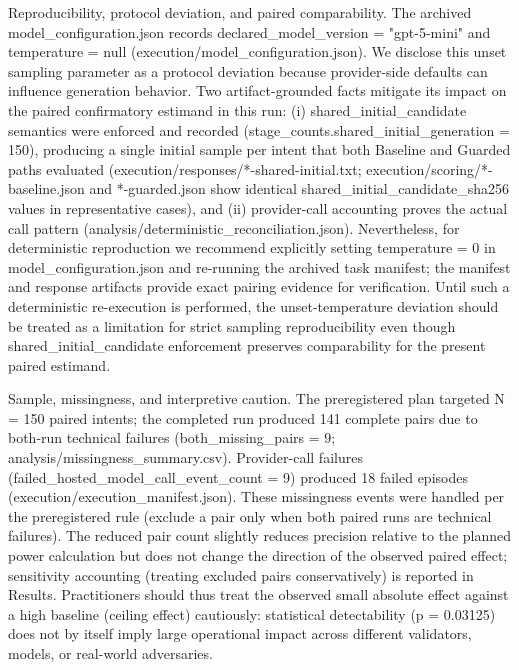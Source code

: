 \documentclass[conference]{IEEEtran}
\begin{document}
Reproducibility, protocol deviation, and paired comparability. The archived model\_configuration.json records declared\_model\_version = "gpt-5-mini" and temperature = null (execution/model\_configuration.json). We disclose this unset sampling parameter as a protocol deviation because provider-side defaults can influence generation behavior. Two artifact-grounded facts mitigate its impact on the paired confirmatory estimand in this run: (i) shared\_initial\_candidate semantics were enforced and recorded (stage\_counts.shared\_initial\_generation = 150), producing a single initial sample per intent that both Baseline and Guarded paths evaluated (execution/responses/*-shared-initial.txt; execution/scoring/*-baseline.json and *-guarded.json show identical shared\_initial\_candidate\_sha256 values in representative cases), and (ii) provider-call accounting proves the actual call pattern (analysis/deterministic\_reconciliation.json). Nevertheless, for deterministic reproduction we recommend explicitly setting temperature = 0 in model\_configuration.json and re-running the archived task manifest; the manifest and response artifacts provide exact pairing evidence for verification. Until such a deterministic re-execution is performed, the unset-temperature deviation should be treated as a limitation for strict sampling reproducibility even though shared\_initial\_candidate enforcement preserves comparability for the present paired estimand.

Sample, missingness, and interpretive caution. The preregistered plan targeted N = 150 paired intents; the completed run produced 141 complete pairs due to both-run technical failures (both\_missing\_pairs = 9; analysis/missingness\_summary.csv). Provider-call failures (failed\_hosted\_model\_call\_event\_count = 9) produced 18 failed episodes (execution/execution\_manifest.json). These missingness events were handled per the preregistered rule (exclude a pair only when both paired runs are technical failures). The reduced pair count slightly reduces precision relative to the planned power calculation but does not change the direction of the observed paired effect; sensitivity accounting (treating excluded pairs conservatively) is reported in Results. Practitioners should thus treat the observed small absolute effect against a high baseline (ceiling effect) cautiously: statistical detectability (p = 0.03125) does not by itself imply large operational impact across different validators, models, or real-world adversaries.
\end{document}
